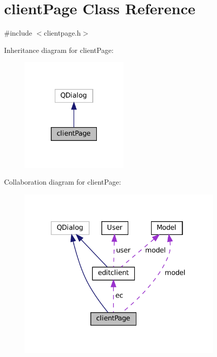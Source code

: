 \hypertarget{classclientPage}{}\section{client\+Page Class Reference}
\label{classclientPage}


{\ttfamily \#include $<$clientpage.\+h$>$}



Inheritance diagram for client\+Page\+:\nopagebreak
\begin{figure}[H]
\begin{center}
\leavevmode
\includegraphics[width=147pt]{classclientPage__inherit__graph}
\end{center}
\end{figure}


Collaboration diagram for client\+Page\+:\nopagebreak
\begin{figure}[H]
\begin{center}
\leavevmode
\includegraphics[width=279pt]{classclientPage__coll__graph}
\end{center}
\end{figure}
